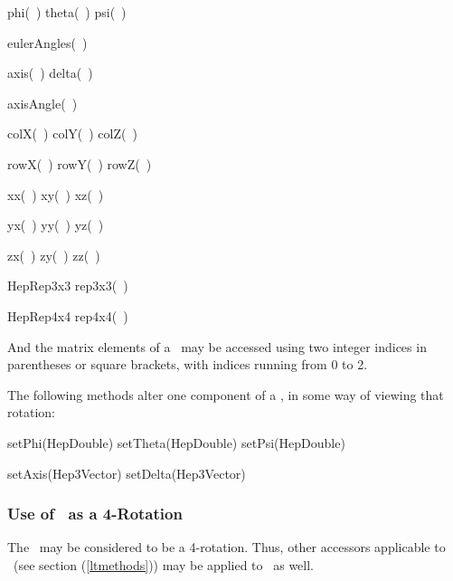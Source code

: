 \begin{shortlist}
  \item phi(~) \/\/\/ theta(~) \/\/\/ psi(~) 
		\see{\ref{eq:eulerrot},\ref{eq:phipsiconv},\ref{eq:thetaconv}}
  \item eulerAngles(~) 	
		\see{\ref{eq:eulerrot},\ref{eq:phipsiconv},\ref{eq:thetaconv}}
  \item axis(~)	\/\/\/ delta(~)
  \item axisAngle(~) 		\see{\ref{eq:axisrot},\ref{eq:deltaconv}}
  \item colX(~) \/\/\/ colY(~) \/\/\/ colZ(~) 
  \item rowX(~) \/\/\/ rowY(~) \/\/\/ rowZ(~) 
  \item xx(~) \/\/\/ xy(~) \/\/\/ xz(~) 
  \item yx(~) \/\/\/ yy(~) \/\/\/ yz(~) 
  \item zx(~) \/\/\/ zy(~) \/\/\/ zz(~) 

  \item HepRep3x3 rep3x3(~) 	

  \item HepRep4x4 rep4x4(~) 

\end{shortlist}

And the matrix elements of a \Ro\ may be accessed using two integer indices
in parentheses or square brackets, with indices running from 0 to 2.

The following methods alter one component of a \Ro, in some way of viewing 
that rotation:

\begin{shortlist}
  \item setPhi(HepDouble) \/\/\/ setTheta(HepDouble) \/\/\/ setPsi(HepDouble) 
		\see{\ref{eq:eulerrotR}}
  \item setAxis(Hep3Vector)	\/\/\/ setDelta(Hep3Vector)
		\see{\ref{eq:axisrotR}}
\end{shortlist}


\subsubsection{Use of \protect\Ro\ as a 4-Rotation}

The \Ro\ may be considered to be a 4-rotation.  Thus, other accessors 
applicable to \LT\ (see section (\ref{ltmethods}))
may be applied to \Ro\ as well.


